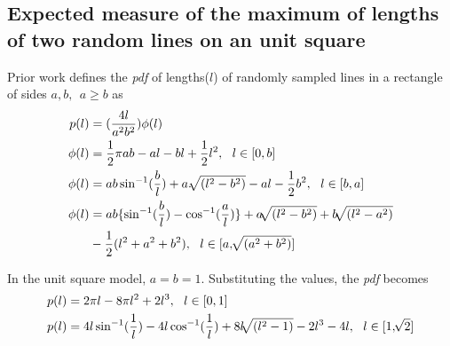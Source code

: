\subsection{Expected measure of the maximum of lengths of two random lines on an unit square}
Prior work \cite{ghosh1951random} defines the \textit{pdf} of lengths($l$) of randomly sampled lines in a rectangle of sides $a,b, \ \ a\geq b$ as 
\begin{align*}
p(l) &= (\frac{4l}{a^2b^2})\phi(l)\\
\phi(l)&= \frac{1}{2}\pi a b - a l - b l + \frac{1}{2} l^2, \ \ l\in[0,b]\\
\phi(l)&= ab \sininv(\frac{b}{l}) + a. \sqrt[]{(l^2-b^2)} - al - \frac{1}{2}b^2, \ \ l\in[b,a]\\
\phi(l)&= ab\{\sininv(\frac{b}{l})-\cosinv(\frac{a}{l})\} + a\sqrt[]{(l^2-b^2)} + b\sqrt[]{(l^2-a^2)} \\
&- \frac{1}{2}(l^2+a^2+b^2),\ \ l\in[a,\sqrt[]{(a^2+b^2)}]
\end{align*}

In the unit square model, $a=b=1$. Substituting the values, the \textit{pdf} becomes
\begin{align}
p(l)&= 2\pi l - 8\pi l^2 + 2l^3, \ \ l\in[0,1]\\
p(l)&= 4l\sin^{-1}(\frac{1}{l}) - 4l\cos^{-1}(\frac{1}{l}) + 8l\sqrt[]{(l^2-1)} -2l^3 -4l, \ \ l\in[1,\sqrt[]{2}]
\end{align}

